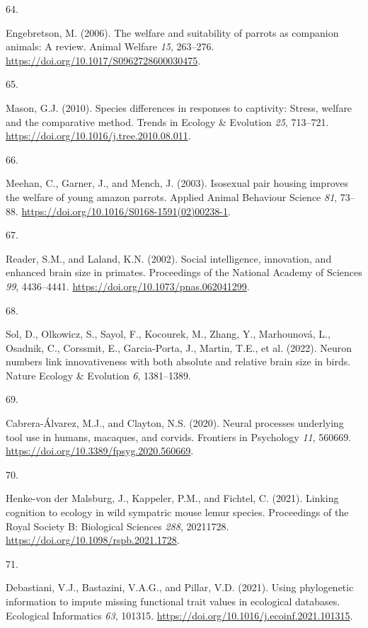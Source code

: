 \documentclass[
  man, donotrepeattitle,floatsintext]{apa6}
\newlength{\cslhangindent}
\newlength{\csllabelwidth}
\newlength{\cslentryspacingunit} %
\newenvironment{CSLReferences}[2] %
 {%
  \setlength{\parindent}{0pt}
  \ifodd #1
  \let\oldpar\par
  \def\par{\hangindent=\cslhangindent\oldpar}
  \fi
  \setlength{\parskip}{#2\cslentryspacingunit}
 }%
 {}
\newcommand{\CSLLeftMargin}[1]{\parbox[t]{\csllabelwidth}{#1}}
\newcommand{\CSLRightInline}[1]{\parbox[t]{\linewidth - \csllabelwidth}{#1}\break}
\begin{document}
\begin{CSLReferences}{0}{0}
\leavevmode{}%
\CSLLeftMargin{64. }%
\CSLRightInline{Engebretson, M. (2006). The welfare and suitability of parrots as companion animals: A review. Animal Welfare \emph{15}, 263--276. \url{https://doi.org/10.1017/S0962728600030475}.}

\leavevmode{}%
\CSLLeftMargin{65. }%
\CSLRightInline{Mason, G.J. (2010). Species differences in responses to captivity: Stress, welfare and the comparative method. Trends in Ecology \& Evolution \emph{25}, 713--721. \url{https://doi.org/10.1016/j.tree.2010.08.011}.}

\leavevmode{}%
\CSLLeftMargin{66. }%
\CSLRightInline{Meehan, C., Garner, J., and Mench, J. (2003). Isosexual pair housing improves the welfare of young amazon parrots. Applied Animal Behaviour Science \emph{81}, 73--88. \url{https://doi.org/10.1016/S0168-1591(02)00238-1}.}

\leavevmode{}%
\CSLLeftMargin{67. }%
\CSLRightInline{Reader, S.M., and Laland, K.N. (2002). Social intelligence, innovation, and enhanced brain size in primates. Proceedings of the National Academy of Sciences \emph{99}, 4436--4441. \url{https://doi.org/10.1073/pnas.062041299}.}

\leavevmode{}%
\CSLLeftMargin{68. }%
\CSLRightInline{Sol, D., Olkowicz, S., Sayol, F., Kocourek, M., Zhang, Y., Marhounová, L., Osadnik, C., Corssmit, E., Garcia-Porta, J., Martin, T.E., et al. (2022). Neuron numbers link innovativeness with both absolute and relative brain size in birds. Nature Ecology \& Evolution \emph{6}, 1381--1389.}

\leavevmode{}%
\CSLLeftMargin{69. }%
\CSLRightInline{Cabrera-Álvarez, M.J., and Clayton, N.S. (2020). Neural processes underlying tool use in humans, macaques, and corvids. Frontiers in Psychology \emph{11}, 560669. \url{https://doi.org/10.3389/fpsyg.2020.560669}.}

\leavevmode{}%
\CSLLeftMargin{70. }%
\CSLRightInline{Henke-von der Malsburg, J., Kappeler, P.M., and Fichtel, C. (2021). Linking cognition to ecology in wild sympatric mouse lemur species. Proceedings of the Royal Society B: Biological Sciences \emph{288}, 20211728. \url{https://doi.org/10.1098/rspb.2021.1728}.}

\leavevmode{}%
\CSLLeftMargin{71. }%
\CSLRightInline{Debastiani, V.J., Bastazini, V.A.G., and Pillar, V.D. (2021). Using phylogenetic information to impute missing functional trait values in ecological databases. Ecological Informatics \emph{63}, 101315. \url{https://doi.org/10.1016/j.ecoinf.2021.101315}.}


\end{CSLReferences}
\end{document}
